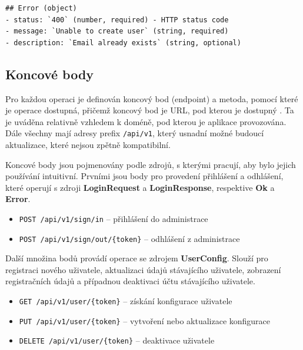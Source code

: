 \documentclass[FM,DP]{tulthesis}
\newenvironment{code}
    {\filbreak\captionsetup{type=listing}}{\filbreak}
\begin{document}

\begin{code}
\captionsetup{singlelinecheck=false,justification=raggedright}
\label{code:api-error}
\begin{verbatim}
## Error (object)
- status: `400` (number, required) - HTTP status code
- message: `Unable to create user` (string, required)
- description: `Email already exists` (string, optional)
\end{verbatim}
\end{code}

\subsection{Koncové body}

Pro každou operaci je definován koncový bod (endpoint) a metoda, pomocí které je operace
dostupná, přičemž koncový bod je URL, pod kterou je dostupný \cite{api}. Ta je uváděna relativně
vzhledem k doméně, pod kterou je aplikace provozována. Dále všechny mají adresy
prefix \verb|/api/v1|, který usnadní možné budoucí aktualizace, které nejsou zpětně kompatibilní.

Koncové body jsou pojmenovány podle zdrojů, s kterými pracují, aby bylo jejich používání 
intuitivní. Prvními jsou body pro provedení přihlášení a odhlášení, které operují
s zdroji \textbf{LoginRequest} a \textbf{LoginResponse}, respektive \textbf{Ok} a \textbf{Error}.

\begin{itemize}
\item \verb|POST /api/v1/sign/in| -- přihlášení do administrace
\item \verb|POST /api/v1/sign/out/{token}| -- odhlášení z administrace
\end{itemize}

Další množina bodů provádí operace se zdrojem \textbf{UserConfig}. Slouží pro registraci
nového uživatele, aktualizaci údajů stávajícího uživatele, zobrazení registračních údajů
a případnou deaktivaci účtu stávajícího uživatele.

\begin{itemize}
\item \verb|GET /api/v1/user/{token}| -- získání konfigurace uživatele
\item \verb|PUT /api/v1/user/{token}| -- vytvoření nebo aktualizace konfigurace
\item \verb|DELETE /api/v1/user/{token}| -- deaktivace uživatele
\end{itemize}
\end{document}
